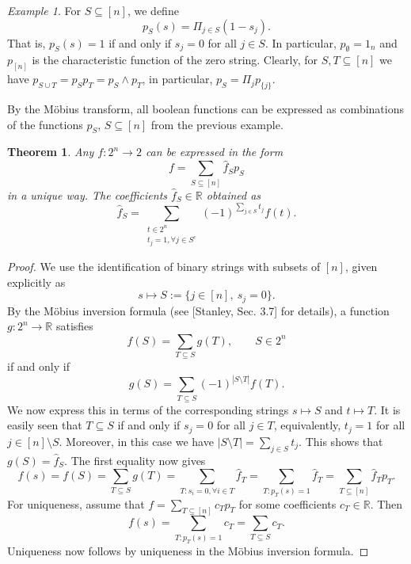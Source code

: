 \documentclass[12pt]{article}
\newtheorem{theorem}{Theorem}
\theoremstyle{definition}
\theoremstyle{remark}
\newtheorem{exm}{Example}
\begin{document}
\begin{exm}\label{ex:pS}
For $S\subseteq [n]$, we define
\[
p_S(s)=\Pi_{j\in S}(1-s_j).
\]
That is, $p_S(s)=1$ if and only if $s_j=0$ for all $j\in S$. In particular,
$p_\emptyset=1_n$ and $p_{[n]}$ is the characteristic function of the zero string.
Clearly, for $S,T\subseteq [n]$ we have $p_{S\cup T}=p_Sp_T=p_S\wedge p_T$, in particular,
$p_S=\Pi_jp_{\{j\}}$. 
\end{exm}

By the M\"obius transform, all boolean functions can be expressed as combinations of the functions $p_S$, $S\subseteq
[n]$ from the previous example.

\begin{theorem}\label{thm:basis} Any $f:2^n\to 2$ can be expressed  in the form 
\[
f=\sum_{S\subseteq [n]} \hat f_Sp_S
\]
in a unique way. The coefficients  $\hat f_S\in \mathbb R$ obtained as
\[
\hat f_S=\sum_{\substack{t\in 2^n\\ t_j=1, \forall  j\in S^c}} (-1)^{\sum_{j\in
S}t_j}f(t).
\]

\end{theorem}

\begin{proof} We use the identification of binary strings with subsets of $[n]$, given
explicitly as
\[
s\mapsto S:=\{j\in [n],\  s_j=0\}.
\]
 By the M\"obius inversion formula (see [Stanley, Sec. 3.7] for details), a  function $g: 2^n\to \mathbb R$ satisfies  
\[
f(S)=\sum_{T\subseteq S} g(T),\qquad S\in 2^n
\]
if and only if 
\[
g(S)=\sum_{T\subseteq S}(-1)^{|S\setminus T|} f(T).
\]
We now express this in terms of the corresponding strings $s\mapsto S$ and $t\mapsto T$.
It is easily seen that $T\subseteq S$ if and only if
$s_j=0$ for all $j\in T$, equivalently, $t_j=1$ for all $j\in [n]\setminus S$. Moreover,
in this case we have  $|S\setminus T|=\sum_{j\in S} t_j$. This shows that $g(S)=\hat f_S$.
The first equality now gives
\[
f(s)=f(S)=\sum_{T\subseteq S} g(T)=\sum_{T:s_i=0,\forall i\in T}\hat f_T=\sum_{T:
p_T(s)=1}\hat f_T=\sum_{T\subseteq [n]} \hat f_Tp_T.
\]
For uniqueness, assume that $f=\sum_{T\subseteq [n]} c_Tp_T$ for some coefficients $c_T\in
\mathbb R$. Then 
\[
f(s)=\sum_{T: p_T(s)=1}c_T=\sum_{T\subseteq S}c_T.
\]
Uniqueness now follows by  uniqueness in the M\"obius inversion formula.

\end{proof}





\end{document}
